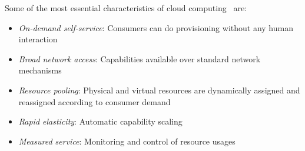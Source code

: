 Some of the most essential characteristics of cloud computing~\cite{nist:mell11} are:
\begin{itemize}
  \item \emph{On-demand self-service}: Consumers can do provisioning without any human interaction
  \item \emph{Broad network access}: Capabilities available over standard network mechanisms
  \item \emph{Resource pooling}: Physical and virtual resources are dynamically assigned
    and reassigned according to consumer demand
  \item \emph{Rapid elasticity}: Automatic capability scaling
  \item \emph{Measured service}: Monitoring and control of resource usages
\end{itemize}

